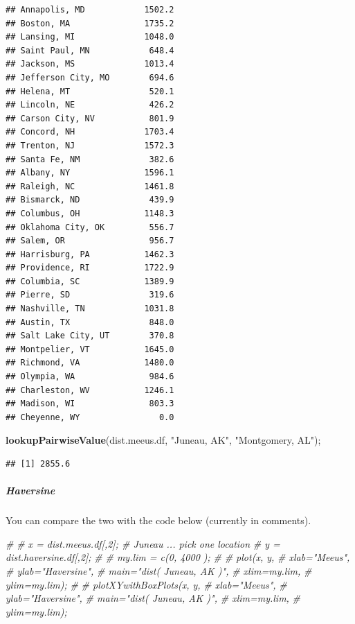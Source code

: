 \documentclass[
]{article}
\newenvironment{Shaded}{\begin{snugshade}}{\end{snugshade}}
\newcommand{\CommentTok}[1]{\textcolor[rgb]{0.56,0.35,0.01}{\textit{#1}}}
\newcommand{\KeywordTok}[1]{\textcolor[rgb]{0.13,0.29,0.53}{\textbf{#1}}}
\newcommand{\NormalTok}[1]{#1}
\newcommand{\StringTok}[1]{\textcolor[rgb]{0.31,0.60,0.02}{#1}}
\begin{document}
\begin{verbatim}
## Annapolis, MD            1502.2
## Boston, MA               1735.2
## Lansing, MI              1048.0
## Saint Paul, MN            648.4
## Jackson, MS              1013.4
## Jefferson City, MO        694.6
## Helena, MT                520.1
## Lincoln, NE               426.2
## Carson City, NV           801.9
## Concord, NH              1703.4
## Trenton, NJ              1572.3
## Santa Fe, NM              382.6
## Albany, NY               1596.1
## Raleigh, NC              1461.8
## Bismarck, ND              439.9
## Columbus, OH             1148.3
## Oklahoma City, OK         556.7
## Salem, OR                 956.7
## Harrisburg, PA           1462.3
## Providence, RI           1722.9
## Columbia, SC             1389.9
## Pierre, SD                319.6
## Nashville, TN            1031.8
## Austin, TX                848.0
## Salt Lake City, UT        370.8
## Montpelier, VT           1645.0
## Richmond, VA             1480.0
## Olympia, WA               984.6
## Charleston, WV           1246.1
## Madison, WI               803.3
## Cheyenne, WY                0.0
\end{verbatim}

\begin{Shaded}
\begin{Highlighting}[]
\KeywordTok{lookupPairwiseValue}\NormalTok{(dist.meeus.df, }\StringTok{"Juneau, AK"}\NormalTok{, }\StringTok{"Montgomery, AL"}\NormalTok{);}
\end{Highlighting}
\end{Shaded}

\begin{verbatim}
## [1] 2855.6
\end{verbatim}

\hypertarget{haversine}{%
\subparagraph{\texorpdfstring{\textbf{Haversine}}{Haversine}}\label{haversine}}

You can compare the two with the code below (currently in comments).

\begin{Shaded}
\begin{Highlighting}[]
\CommentTok{\# }
\CommentTok{\# x = dist.meeus.df[,2]; \# Juneau ... pick one location}
\CommentTok{\# y = dist.haversine.df[,2];}
\CommentTok{\# }
\CommentTok{\# my.lim = c(0, 4000 );}
\CommentTok{\# }
\CommentTok{\# plot(x, y,  }
\CommentTok{\#             xlab="Meeus", }
\CommentTok{\#             ylab="Haversine", }
\CommentTok{\#             main="dist( Juneau, AK )",}
\CommentTok{\#             xlim=my.lim, }
\CommentTok{\#             ylim=my.lim);}
\CommentTok{\# }
\CommentTok{\# plotXYwithBoxPlots(x, y,  }
\CommentTok{\#             xlab="Meeus", }
\CommentTok{\#             ylab="Haversine", }
\CommentTok{\#             main="dist( Juneau, AK )",}
\CommentTok{\#             xlim=my.lim, }
\CommentTok{\#             ylim=my.lim);}
\end{Highlighting}
\end{Shaded}
\end{document}
